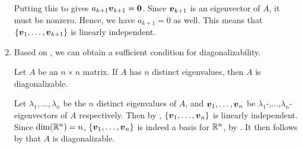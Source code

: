 \begin{enumerate}
\begin{pf}
Putting this to  gives \(a_{k+1}\vb*{v}_{k+1}=\vb*{0}\).
Since \(\vb*{v}_{k+1}\) is an eigenvector of \(A\), it must be nonzero. Hence,
we have \(a_{k+1}=0\) as well. This means that
\(\{\vb*{v}_1,\dotsc,\vb*{v}_{k+1}\}\) is linearly independent.
\end{pf}

\item Based on , we can obtain a sufficient
condition for diagonalizability.

\begin{corollary}
\label{cor:n-diff-eigenval-diag}
Let \(A\) be an \(n\times n\) matrix. If \(A\) has \(n\) distinct eigenvalues,
then \(A\) is diagonalizable.
\end{corollary}
\begin{pf}
Let \(\lambda_1,\dotsc,\lambda_n\) be the \(n\) distinct eigenvalues of \(A\),
and \(\vb*{v}_1,\dotsc,\vb*{v}_n\) be
\(\lambda_1\)-,...,\(\lambda_n\)-eigenvectors of \(A\) respectively. Then by
, \(\{\vb*{v}_1,\dotsc,\vb*{v}_n\}\) is
linearly independent. Since \(\dim(\mathbb{R}^n)=n\),
\(\{\vb*{v}_1,\dotsc,\vb*{v}_n\}\) is indeed a basis for \(\mathbb{R}^n\), by
. It then follows by  that
\(A\) is diagonalizable.
\end{pf}
\end{enumerate}
